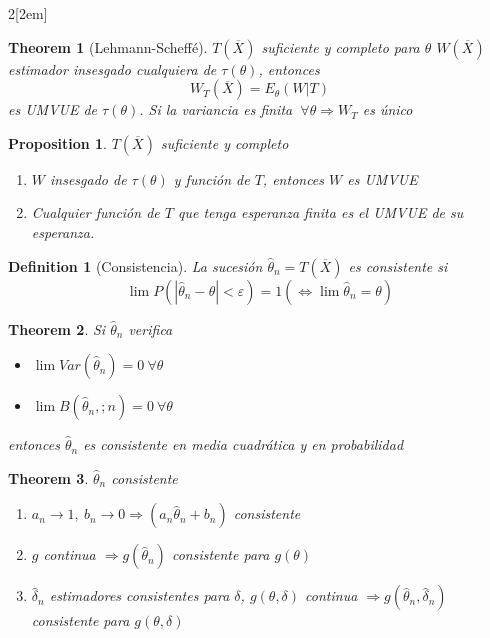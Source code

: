 \documentclass[leqno]{article}
\newtheorem*{theorem}{Theorem}
\newtheorem*{proposition}{Proposition}
\newtheorem*{definition}{Definition}
\begin{document}
\begin{multicols}{2}[\columnsep2em]
\begin{theorem}[Lehmann-Scheffé] $T(\overline{X})$ suficiente y completo para $\theta$ $W(\overline{X})$ estimador insesgado cualquiera de $\tau (\theta )$, entonces  
  \[
  W_T(\overline{X}) = E_\theta (W|T)
  \] 
  es UMVUE de $\tau (\theta )$. Si la variancia es finita $\ \forall \theta \Rightarrow W_T$ es único

\end{theorem}

\begin{proposition}$T(\overline{X})$ suficiente y completo
  \begin{enumerate}[topsep=-6pt, itemsep=0pt]
    \item $W$ insesgado de  $\tau (\theta )$ y función de $T$, entonces  $W$ es UMVUE 
	\item Cualquier función de  $T$ que tenga esperanza finita es el UMVUE de su esperanza.
  \end{enumerate}
\end{proposition}







\begin{definition}[Consistencia] La sucesión $\hat{\theta}_n = T(\overline{X})$ es consistente si 
\[
\lim P(|\hat{\theta }_n-\theta |<\varepsilon ) = 1 (\iff \lim \hat{\theta }_n = \theta )
\] 
\end{definition}

\begin{theorem} Si $\hat{\theta }_n$ verifica
  \begin{itemize}[topsep=-6pt, itemsep=0pt]
    \item $\lim Var(\hat{\theta }_n) = 0 \ \forall \theta$
	\item $\lim B(\hat{\theta }_n,;n) = 0 \ \forall \theta $
  \end{itemize}
entonces $\hat{\theta}_n$ es consistente en media cuadrática y en probabilidad
\end{theorem}

\begin{theorem} $\hat{\theta }_n$ consistente
  \begin{enumerate}[topsep=-6pt, itemsep=0pt]
    \item $a_n \to  1, \ b_n \to  0 \Rightarrow (a_n \hat{\theta }_n + b_n)$ consistente
	\item $g$ continua $\Rightarrow g(\hat{\theta}_n)$ consistente para $g(\theta)$
	\item $\hat{\delta}_n$ estimadores consistentes para $\delta$, $g(\theta , \delta)$ continua  $\Rightarrow g(\hat{\theta }_n, \hat{\delta}_n)$ consistente para $g(\theta , \delta)$
  \end{enumerate}
\end{theorem}


\end{multicols}
\end{document}
